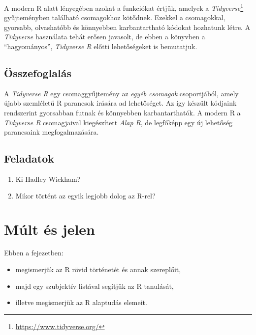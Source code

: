 \documentclass[
]{book}
\makeatletter
\DeclareRobustCommand{\href}[2]{#2\footnote{\url{#1}}}
\providecommand{\tightlist}{%
  \setlength{\itemsep}{0pt}\setlength{\parskip}{0pt}}
\renewcommand{\href}[2]{#2\footnote{\url{#1}}}
\newenvironment{kframe}{%
\medskip{}
\setlength{\fboxsep}{.8em}
 \def\at@end@of@kframe{}%
 \ifinner\ifhmode%
  \def\at@end@of@kframe{\end{minipage}}%
  \begin{minipage}{\columnwidth}%
 \fi\fi%
 \def\FrameCommand##1{\hskip\@totalleftmargin \hskip-\fboxsep
 \colorbox{shadecolor}{##1}\hskip-\fboxsep
     \hskip-\linewidth \hskip-\@totalleftmargin \hskip\columnwidth}%
 \MakeFramed {\advance\hsize-\width
   \@totalleftmargin\z@ \linewidth\hsize
   \@setminipage}}%
 {\par\unskip\endMakeFramed%
 \at@end@of@kframe}
\newenvironment{rmdblock}[1]
  {
  \begin{itemize}
  \renewcommand{\labelitemi}{
    \raisebox{-.7\height}[0pt][0pt]{
      {\setkeys{Gin}{width=3em,keepaspectratio}\texttt{[image: images/\#1]}}
    }
  }
  \setlength{\fboxsep}{1em}
  \begin{kframe}
  \item
  }
  {
  \end{kframe}
  \end{itemize}
  }
\newenvironment{rmdlevel3}
  {\begin{rmdblock}{level3}}
  {\end{rmdblock}}
\newenvironment{rmdsummary}
  {\begin{rmdblock}{summary}}
  {\end{rmdblock}}
\newenvironment{rmdexercise}
  {\begin{rmdblock}{exercise}}
  {\end{rmdblock}}
\makeatother
\begin{document}
A modern R alatt lényegében azokat a funkciókat értjük, amelyek a \href{https://www.tidyverse.org/}{\emph{Tidyverse}} gyűjteményben található csomagokhoz kötődnek. Ezekkel a csomagokkal, gyorsabb, olvashatóbb és könnyebben karbantartható kódokat hozhatunk létre. A \emph{Tidyverse} használata tehát erősen javasolt, de ebben a könyvben a ``hagyományos'', \emph{Tidyverse R} előtti lehetőségeket is bemutatjuk.

\hypertarget{mi-az-r-2-summary}{%
\subsection{Összefoglalás}\label{mi-az-r-2-summary}}

\begin{rmdsummary}
A \emph{Tidyverse R} egy csomaggyűjtemény az \emph{egyéb csomagok}
csoportjából, amely újabb szemléletű R parancsok írására ad lehetőséget.
Az így készült kódjaink rendszerint gyorsabban futnak és könnyebben
karbantarthatók. A modern R a \emph{Tidyverse R} csomagjaival
kiegészített \emph{Alap R}, de legfőképp egy új lehetőség parancsaink
megfogalmazására.
\end{rmdsummary}

\hypertarget{mi-az-r-2-exercise}{%
\subsection{Feladatok}\label{mi-az-r-2-exercise}}

\begin{rmdexercise}
\begin{enumerate}
\def\labelenumi{\arabic{enumi}.}
\tightlist
\item
  Ki Hadley Wickham?
\item
  Mikor történt az egyik legjobb dolog az R-rel?
\end{enumerate}
\end{rmdexercise}

\hypertarget{muxfalt-uxe9s-jelen}{%
\section{Múlt és jelen}\label{muxfalt-uxe9s-jelen}}

\begin{rmdlevel3}
Ebben a fejezetben:

\begin{itemize}
\tightlist
\item
  megismerjük az R rövid történetét és annak szereplőit,
\item
  majd egy szubjektív listával segítjük az R tanulását,
\item
  illetve megismerjük az R alaptudás elemeit.
\end{itemize}
\end{rmdlevel3}
\end{document}
